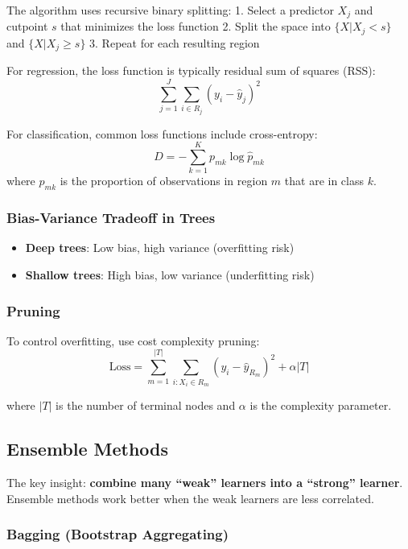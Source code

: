 \documentclass[
  letterpaper,
  DIV=11,
  numbers=noendperiod]{scrreprt}
\providecommand{\tightlist}{%
  \setlength{\itemsep}{0pt}\setlength{\parskip}{0pt}}
\begin{document}
The algorithm uses recursive binary splitting: 1. Select a predictor
\(X_j\) and cutpoint \(s\) that minimizes the loss function 2. Split the
space into \(\{X | X_j < s\}\) and \(\{X | X_j \geq s\}\) 3. Repeat for
each resulting region

For regression, the loss function is typically residual sum of squares
(RSS): \[
\sum_{j=1}^J \sum_{i \in R_j} \left(y_i - \hat{y}_j \right)^2
\]

For classification, common loss functions include cross-entropy: \[
D = - \sum_{k=1}^K p_{mk} \log \hat{p}_{mk}
\] where \(\hat{p}_{mk}\) is the proportion of observations in region
\(m\) that are in class \(k\).

\subsubsection{Bias-Variance Tradeoff in
Trees}\label{bias-variance-tradeoff-in-trees}

\begin{itemize}
\tightlist
\item
  \textbf{Deep trees}: Low bias, high variance (overfitting risk)
\item
  \textbf{Shallow trees}: High bias, low variance (underfitting risk)
\end{itemize}

\subsubsection{Pruning}\label{pruning}

To control overfitting, use cost complexity pruning: \[
\text{Loss} = \sum_{m=1}^{|T|} \sum_{i: X_i \in R_m} \left(y_i - \hat{y}_{R_m} \right)^2 + \alpha |T|
\]

where \(|T|\) is the number of terminal nodes and \(\alpha\) is the
complexity parameter.

\subsection{Ensemble Methods}\label{ensemble-methods}

The key insight: \textbf{combine many ``weak'' learners into a
``strong'' learner}. Ensemble methods work better when the weak learners
are less correlated.

\subsubsection{Bagging (Bootstrap
Aggregating)}\label{bagging-bootstrap-aggregating}
\end{document}
